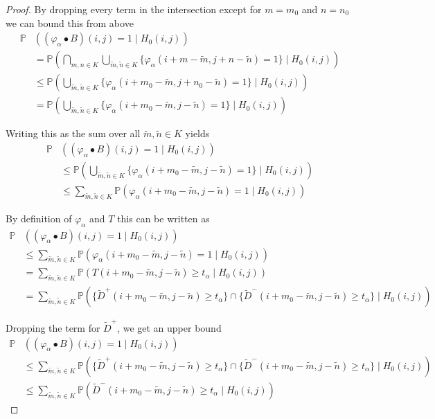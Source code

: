 \documentclass[a4paper,12pt]{article}
\theoremstyle{plain}
\theoremstyle{definition}
\theoremstyle{remark}
\begin{document}
\begin{proof}
	By dropping every term in the intersection except for $m = m_0$ and $n = n_0$ we can bound this from above
	\begin{align*}
		\mathbb{P}&( (\varphi_\alpha \bullet B)(i, j) = 1 \mid H_0(i, j) ) \\
		&= \mathbb{P}\left( \bigcap_{m, n \in K} \bigcup_{\tilde{m}, \tilde{n} \in K} \{ \varphi_\alpha(i + m - \tilde{m}, j + n - \tilde{n}) = 1 \} \mid H_0(i, j) \right) \\
		&\leq \mathbb{P}\left( \bigcup_{\tilde{m}, \tilde{n} \in K} \{ \varphi_\alpha(i + m_0 - \tilde{m}, j + n_0 - \tilde{n}) = 1 \} \mid H_0(i, j) \right) \\
		&= \mathbb{P}\left( \bigcup_{\tilde{m}, \tilde{n} \in K} \{ \varphi_\alpha(i + m_0 - \tilde{m}, j - \tilde{n}) = 1 \} \mid H_0(i, j) \right)
	\end{align*}
	
	Writing this as the sum over all $\tilde{m}, \tilde{n} \in K$ yields
	\begin{align*}
		\mathbb{P}&( (\varphi_\alpha \bullet B)(i, j) = 1 \mid H_0(i, j) ) \\
		&\leq \mathbb{P}\left( \bigcup_{\tilde{m}, \tilde{n} \in K} \{ \varphi_\alpha(i + m_0 - \tilde{m}, j - \tilde{n}) = 1 \} \mid H_0(i, j) \right) \\
		&\leq \sum_{\tilde{m}, \tilde{n} \in K} \mathbb{P}\left( \varphi_\alpha(i + m_0 - \tilde{m}, j - \tilde{n}) = 1 \mid H_0(i, j) \right)
	\end{align*}
	
	By definition of $\varphi_\alpha$ and $T$ this can be written as
	\begin{align*}
		\mathbb{P}&( (\varphi_\alpha \bullet B)(i, j) = 1 \mid H_0(i, j) ) \\
		&\leq \sum_{\tilde{m}, \tilde{n} \in K} \mathbb{P}\left( \varphi_\alpha(i + m_0 - \tilde{m}, j - \tilde{n}) = 1 \mid H_0(i, j) \right) \\
		&= \sum_{\tilde{m}, \tilde{n} \in K} \mathbb{P}\left( T(i + m_0 - \tilde{m}, j - \tilde{n}) \geq t_\alpha \mid H_0(i, j) \right) \\
		&= \sum_{\tilde{m}, \tilde{n} \in K} \mathbb{P}\left( \{ \tilde{D}^+(i + m_0 - \tilde{m}, j - \tilde{n}) \geq t_\alpha \} \cap \{ \tilde{D}^-(i + m_0 - \tilde{m}, j - \tilde{n}) \geq t_\alpha \} \mid H_0(i, j) \right)
	\end{align*}
	
	Dropping the term for $\tilde{D}^+$, we get an upper bound
	\begin{align*}
		\mathbb{P}&( (\varphi_\alpha \bullet B)(i, j) = 1 \mid H_0(i, j) ) \\
		&\leq \sum_{\tilde{m}, \tilde{n} \in K} \mathbb{P}\left( \{ \tilde{D}^+(i + m_0 - \tilde{m}, j - \tilde{n}) \geq t_\alpha \} \cap \{ \tilde{D}^-(i + m_0 - \tilde{m}, j - \tilde{n}) \geq t_\alpha \} \mid H_0(i, j) \right) \\
		&\leq \sum_{\tilde{m}, \tilde{n} \in K} \mathbb{P}\left( \tilde{D}^-(i + m_0 - \tilde{m}, j - \tilde{n}) \geq t_\alpha \mid H_0(i, j) \right)
	\end{align*}
	

\end{proof}
\end{document}
